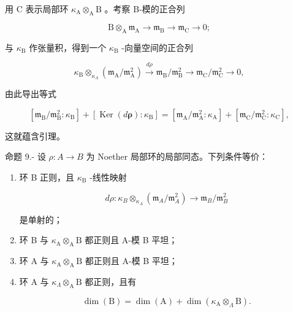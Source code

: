 用 C 表示局部环 \(\kappa_{\mathrm{A}}\otimes_{\mathrm{A}}\mathrm{B}\) 。考察 B-模的正合列

\[
\mathrm{B} \otimes_ {\mathrm{A}} \mathfrak {m} _ {\mathrm{A}} \longrightarrow \mathfrak {m} _ {\mathrm{B}} \longrightarrow \mathfrak {m} _ {\mathrm{C}} \rightarrow 0;
\]

与 \(\kappa_{\mathrm{B}}\) 作张量积，得到一个 \(\kappa_{\mathrm{B}}\) -向量空间的正合列

\[
\kappa_ {\mathrm{B}} \otimes_ {\kappa_ {\Lambda}} (\mathfrak {m} _ {\mathrm{A}} / \mathfrak {m} _ {\mathrm{A}} ^ {2}) \stackrel {d \rho} {\longrightarrow} \mathfrak {m} _ {\mathrm{B}} / \mathfrak {m} _ {\mathrm{B}} ^ {2} \longrightarrow \mathfrak {m} _ {\mathrm{C}} / \mathfrak {m} _ {\mathrm{C}} ^ {2} \rightarrow 0,
\]

由此导出等式

\[
\left[ \mathfrak {m} _ {\mathrm{B}} / \mathfrak {m} _ {\mathrm{B}} ^ {2}: \kappa_ {\mathrm{B}} \right] + \left[ \operatorname{Ker} (d \boldsymbol {\rho}): \kappa_ {\mathrm{B}} \right] = \left[ \mathfrak {m} _ {\mathrm{A}} / \mathfrak {m} _ {\mathrm{A}} ^ {2}: \kappa_ {\mathrm{A}} \right] + \left[ \mathfrak {m} _ {\mathrm{C}} / \mathfrak {m} _ {\mathrm{C}} ^ {2}: \kappa_ {\mathrm{C}} \right],
\]

这就蕴含引理。

命题 9.- 设 \(\rho : A \to B\) 为 Noether 局部环的局部同态。下列条件等价：

\begin{enumerate}
\def\labelenumi{(\roman{enumi})}
\tightlist
\item
  环 B 正则，且 \(\kappa_{\mathrm{B}}\) -线性映射

\[
d \rho : \kappa_ {B} \otimes_ {\kappa_ {A}} \left(\mathfrak {m} _ {A} / \mathfrak {m} _ {A} ^ {2}\right) \longrightarrow \mathfrak {m} _ {B} / \mathfrak {m} _ {B} ^ {2}
\]

是单射的；

\item
  环 B 与 \(\kappa_{\mathrm{A}}\otimes_{\mathrm{A}}\mathrm{B}\) 都正则且 A-模 B 平坦；
\item
  环 A 与 \(\kappa_{\mathrm{A}}\otimes_{\mathrm{A}}\mathrm{B}\) 都正则且 A-模 B 平坦；
\item
  环 A 与 \(\kappa_{\Lambda} \otimes_{\mathrm{A}} \mathrm{B}\) 都正则，且有

\[
\dim (\mathrm{B}) = \dim (\mathrm{A}) + \dim (\kappa_ {\mathrm{A}} \otimes_ {\Lambda} \mathrm{B}).
\]
\end{enumerate}


